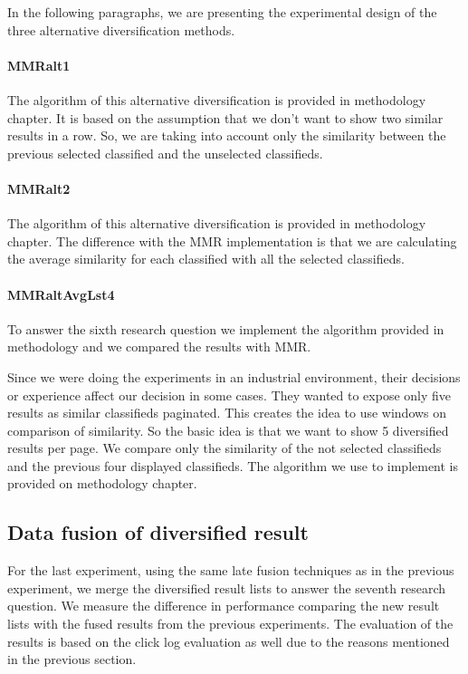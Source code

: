 In the following paragraphs, we are presenting the experimental design of the three alternative diversification methods.

 \paragraph{MMRalt1}

The algorithm of this alternative diversification is provided in methodology chapter. It is based on the assumption that we don't want to show two similar results in a row. So, we are taking into account only the similarity between the previous selected classified and the unselected classifieds.

 \paragraph{MMRalt2}

The algorithm of this alternative diversification is provided in methodology chapter. The difference with the MMR implementation is that we are calculating the average similarity for each classified with all the selected classifieds.

 \paragraph{MMRaltAvgLst4}

To answer the sixth research question we implement the algorithm provided in methodology and we compared the results with MMR.

Since we were doing the experiments in an industrial environment, their decisions or experience affect our decision in some cases. They wanted to expose only five results as similar classifieds paginated. This creates the idea to use windows on comparison of similarity. So the basic idea is that we want to show 5 diversified results per page. We compare only the similarity of the not selected classifieds and the previous four displayed classifieds. The algorithm we use to implement is provided on methodology chapter.

\subsection{Data fusion of diversified result}
For the last experiment, using the same late fusion techniques as in the previous experiment, we merge the diversified result lists to answer the seventh research question. We measure the difference in performance comparing the new result lists with the fused results from the previous experiments. The evaluation of the results is based on the click log evaluation as well due to the reasons mentioned in the previous section.




